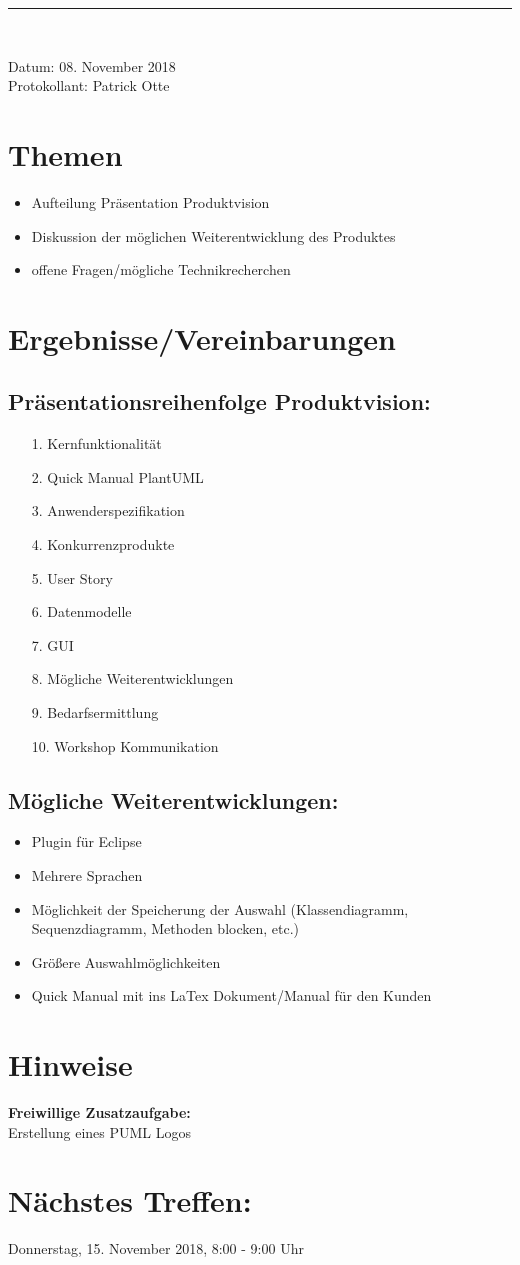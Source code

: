\begin{center}  
\vspace{15pt}\nointerlineskip\rule{\textwidth}{0.2pt}\\ 
\vspace{0.5pt}\nointerlineskip
\end{center}
\large Datum: 08. November 2018\vspace{3pt}\\\large Protokollant: Patrick Otte
\section*{Themen}
\begin{itemize}
\item Aufteilung Präsentation Produktvision
\item Diskussion der möglichen Weiterentwicklung des Produktes
\item offene Fragen/mögliche Technikrecherchen
\end{itemize}
\section*{Ergebnisse/Vereinbarungen}
\subsection*{Präsentationsreihenfolge Produktvision:}
\begin{itemize}
\item[1.] Kernfunktionalität
\item[2.] Quick Manual PlantUML
\item[3.] Anwenderspezifikation 
\item[4.] Konkurrenzprodukte
\item[5.] User Story
\item[6.] Datenmodelle
\item[7.] GUI
\item[8.] Mögliche Weiterentwicklungen
\item[9.] Bedarfsermittlung
\item[10.] Workshop Kommunikation
\end{itemize}
\subsection*{Mögliche Weiterentwicklungen:}
\begin{itemize}
\item Plugin für Eclipse
\item Mehrere Sprachen
\item Möglichkeit der Speicherung der Auswahl (Klassendiagramm, Sequenzdiagramm, Methoden
blocken, etc.)
\item Größere Auswahlmöglichkeiten
\item Quick Manual mit ins LaTex Dokument/Manual für den Kunden
\end{itemize}
\section*{Hinweise}
\textbf{Freiwillige Zusatzaufgabe:} \\
Erstellung eines PUML Logos
\section*{Nächstes Treffen:}
Donnerstag, 15. November 2018, 8:00 - 9:00 Uhr